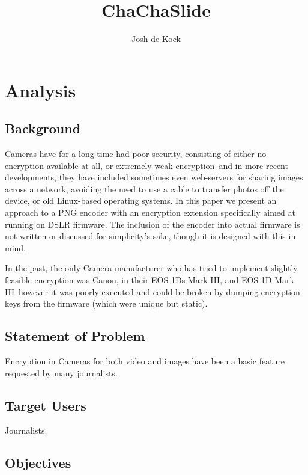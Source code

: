 \documentclass{report}
\begin{document}
\title{ChaChaSlide}
\author{Josh de Kock}

\maketitle

\tableofcontents
\clearpage

\chapter{Analysis}

\section{Background}
Cameras have for a long time had poor security, consisting of either no encryption available at all, or extremely weak encryption--and in more recent developments, they have included sometimes even web-servers for sharing images across a network, avoiding the need to use a cable to transfer photos off the device, or old Linux-based operating systems. In this paper we present an approach to a PNG encoder with an encryption extension specifically aimed at running on DSLR firmware. The inclusion of the encoder into actual firmware is not written or discussed for simplicity's sake, though it is designed with this in mind.

In the past, the only Camera manufacturer who has tried to implement slightly feasible encryption was Canon, in their EOS-1Ds Mark III, and EOS-1D Mark III\cite{canonenc}--however it was poorly executed and could be broken by dumping encryption keys from the firmware (which were unique but static)\cite{stackoverflow}.

\section{Statement of Problem}

Encryption in Cameras for both video and images have been a basic feature requested by many journalists\cite{freedompress}. 

\section{Target Users}

Journalists.

\section{Objectives}
\end{document}
